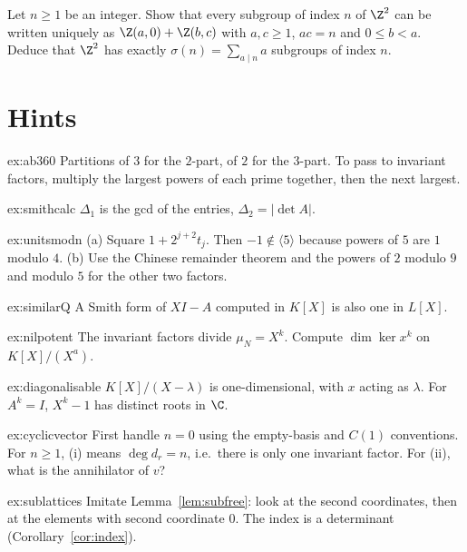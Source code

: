 \begin{exercise}[$\star\star\star$]\label{ex:sublattices}
Let $n\ge1$ be an integer. Show that every subgroup of index $n$ of $\Z^2$ can be written uniquely as $\Z(a,0)+\Z(b,c)$ with $a,c\ge1$, $ac=n$ and $0\le b<a$. Deduce that $\Z^2$ has exactly $\sigma(n)=\sum_{a\mid n}a$ subgroups of index $n$.
\end{exercise}



\section{Hints}

\begin{hint}{ex:ab360}
Partitions of $3$ for the $2$-part, of $2$ for the $3$-part. To pass to invariant factors, multiply the largest powers of each prime together, then the next largest.
\end{hint}
\begin{hint}{ex:smithcalc}
$\Delta_1$ is the gcd of the entries, $\Delta_2=|\det A|$.
\end{hint}
\begin{hint}{ex:unitsmodn}
(a) Square $1+2^{j+2}t_j$. Then $-1\notin\langle5\rangle$ because powers of $5$ are $1$ modulo $4$. (b) Use the Chinese remainder theorem and the powers of $2$ modulo $9$ and modulo $5$ for the other two factors.
\end{hint}
\begin{hint}{ex:similarQ}
A Smith form of $XI-A$ computed in $K[X]$ is also one in $L[X]$.
\end{hint}
\begin{hint}{ex:nilpotent}
The invariant factors divide $\mu_N=X^k$. Compute $\dim\ker x^k$ on $K[X]/(X^a)$.
\end{hint}
\begin{hint}{ex:diagonalisable}
$K[X]/(X-\lambda)$ is one-dimensional, with $x$ acting as $\lambda$. For $A^k=I$, $X^k-1$ has distinct roots in $\C$.
\end{hint}
\begin{hint}{ex:cyclicvector}
First handle $n=0$ using the empty-basis and $C(1)$ conventions. For $n\ge1$, (i) means $\deg d_r=n$, i.e.\ there is only one invariant factor. For (ii), what is the annihilator of $v$?
\end{hint}
\begin{hint}{ex:sublattices}
Imitate Lemma~\ref{lem:subfree}: look at the second coordinates, then at the elements with second coordinate $0$. The index is a determinant (Corollary~\ref{cor:index}).
\end{hint}



